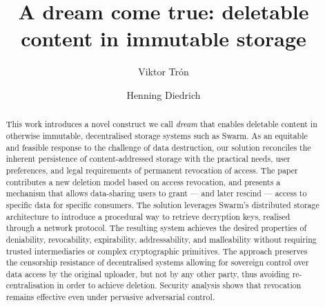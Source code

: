 \documentclass[singlecolumn]{acmart}
\begin{document}
\title[dream]{A dream come true: deletable content in immutable storage}

\author{Viktor Tr\'{o}n}

\author{Henning Diedrich}
\renewcommand{\shortauthors}{Tr\'{o}n \& Diedrich}

\begin{abstract}
This work introduces a novel construct we call \emph{dream} that enables deletable content in otherwise immutable, decentralised storage systems such as Swarm. As an equitable and feasible response to the challenge of data destruction, our solution reconciles the inherent persistence of content-addressed storage with the practical needs, user preferences, and legal requirements of permanent revocation of access.
The paper contributes a new deletion model based on access revocation, and presents a mechanism that allows data-sharing users to grant — and later rescind — access to specific data for specific consumers. The solution leverages Swarm’s distributed storage architecture to introduce a procedural way to retrieve decryption keys, realised through a network protocol. The resulting system achieves the desired properties of deniability, revocability, expirability, addressability, and malleability without requiring trusted intermediaries or complex cryptographic primitives. The approach preserves the censorship resistance of decentralised systems allowing for sovereign control over data access by the original uploader, but not by any other party, thus avoiding re-centralisation in order to achieve deletion. Security analysis shows that revocation remains effective even under pervasive adversarial control.
\end{abstract}
\end{document}
